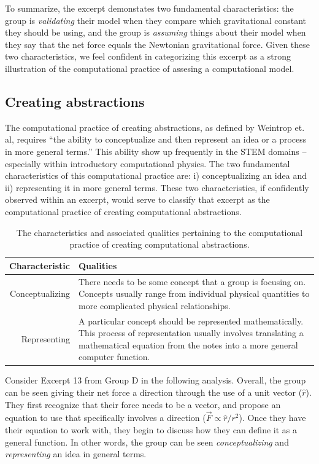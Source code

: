 \documentclass{msuphddissertation}
\begin{document}
\begin{doublespace}
To summarize, the excerpt demonstates two fundamental characteristics: the group is \textit{validating} their model when they compare which gravitational constant they should be using, and the group is \textit{assuming} things about their model when they say that the net force equals the Newtonian gravitational force.  Given these two characteristics, we feel confident in categorizing this excerpt as a strong illustration of the computational practice of assesing a computational model.

\subsection{Creating abstractions}

The computational practice of creating abstractions, as defined by Weintrop et. al, requires ``the ability to conceptualize and then represent an idea or a process in more general terms.''  This ability show up frequently in the STEM domains -- especially within introductory computational physics.  The two fundamental characteristics of this computational practice are: i) conceptualizing an idea and ii) representing it in more general terms.  These two characteristics, if confidently observed within an excerpt, would serve to classify that excerpt as the computational practice of creating computational abstractions.

\begin{table}
\begin{tabular}{r|p{}}
Characteristic & Qualities \\\hline\hline
Conceptualizing & There needs to be some concept that a group is focusing on.  Concepts usually range from individual physical quantities to more complicated physical relationships.\\
Representing & A particular concept should be represented mathematically.  This process of representation usually involves translating a mathematical equation from the notes into a more general computer function.
\end{tabular}\caption{The characteristics and associated qualities pertaining to the computational practice of creating computational abstractions.}
\end{table}

Consider Excerpt 13 from Group D in the following analysis.  Overall, the group can be seen giving their net force a direction through the use of a unit vector ($\hat{r}$).  They first recognize that their force needs to be a vector, and propose an equation to use that specifically involves a direction ($\vec{F}\propto\hat{r}/r^{2}$).  Once they have their equation to work with, they begin to discuss how they can define it as a general function.  In other words, the group can be seen \textit{conceptualizing} and \textit{representing} an idea in general terms.


\end{doublespace}
\end{document}

